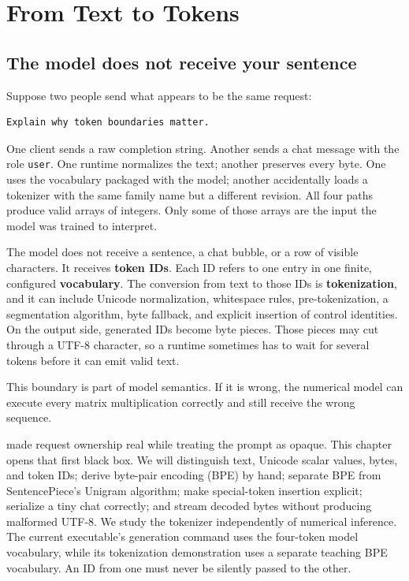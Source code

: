 \chapter{From Text to Tokens}\label{chapter-2-from-text-to-tokens}\label{app:tokens}
\section{The model does not receive your
sentence}\label{the-model-does-not-receive-your-sentence}

Suppose two people send what appears to be the same request:

\begin{verbatim}
Explain why token boundaries matter.
\end{verbatim}

One client sends a raw completion string. Another sends a chat message
with the role \texttt{user}. One runtime normalizes the text; another
preserves every byte. One uses the vocabulary packaged with the model;
another accidentally loads a tokenizer with the same family name but a
different revision. All four paths produce valid arrays of integers.
Only some of those arrays are the input the model was trained to
interpret.

The model does not receive a sentence, a chat bubble, or a row of
visible characters. It receives \textbf{token IDs}. Each ID refers to
one entry in one finite, configured \textbf{vocabulary}. The conversion
from text to those IDs is \textbf{tokenization}, and it can include
Unicode normalization, whitespace rules, pre-tokenization, a
segmentation algorithm, byte fallback, and explicit insertion of control
identities. On the output side, generated IDs become byte pieces. Those
pieces may cut through a UTF-8 character, so a runtime sometimes has to
wait for several tokens before it can emit valid text.

This boundary is part of model semantics. If it is wrong, the numerical
model can execute every matrix multiplication correctly and still
receive the wrong sequence.

 made request ownership real while treating the prompt as
opaque. This chapter opens that first black box. We will distinguish
text, Unicode scalar values, bytes, and token IDs; derive byte-pair
encoding (BPE) by hand; separate BPE from SentencePiece's Unigram
algorithm; make special-token insertion explicit; serialize a tiny chat
correctly; and stream decoded bytes without producing malformed UTF-8.
We study the tokenizer independently of numerical inference. The current
executable's generation command uses the four-token model vocabulary, while
its tokenization demonstration uses a separate teaching BPE vocabulary.
An ID from one must never be silently passed to the other.

